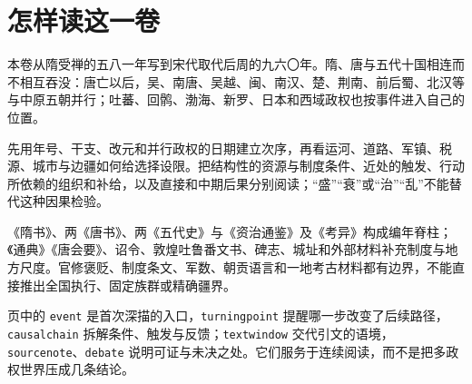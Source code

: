 \chapter*{怎样读这一卷}

本卷从隋受禅的五八一年写到宋代取代后周的九六〇年。隋、唐与五代十国相连而不相互吞没：唐亡以后，吴、南唐、吴越、闽、南汉、楚、荆南、前后蜀、北汉等与中原五朝并行；吐蕃、回鹘、渤海、新罗、日本和西域政权也按事件进入自己的位置。

先用年号、干支、改元和并行政权的日期建立次序，再看运河、道路、军镇、税源、城市与边疆如何给选择设限。把结构性的资源与制度条件、近处的触发、行动所依赖的组织和补给，以及直接和中期后果分别阅读；“盛”“衰”或“治”“乱”不能替代这种因果检验。

《隋书》、两《唐书》、两《五代史》与《资治通鉴》及《考异》构成编年脊柱；《通典》《唐会要》、诏令、敦煌吐鲁番文书、碑志、城址和外部材料补充制度与地方尺度。官修褒贬、制度条文、军数、朝贡语言和一地考古材料都有边界，不能直接推出全国执行、固定族群或精确疆界。

页中的 \texttt{event} 是首次深描的入口，\texttt{turningpoint} 提醒哪一步改变了后续路径，\texttt{causalchain} 拆解条件、触发与反馈；\texttt{textwindow} 交代引文的语境，\texttt{sourcenote}、\texttt{debate} 说明可证与未决之处。它们服务于连续阅读，而不是把多政权世界压成几条结论。
